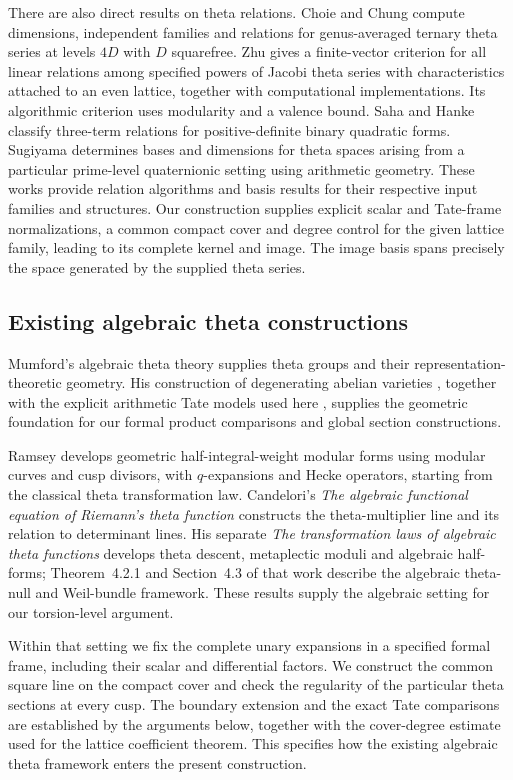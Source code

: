 \documentclass[11pt]{article}
\theoremstyle{remark}\newtheorem{remark}[theorem]{Remark}
\begin{document}
There are also direct results on theta relations. Choie and Chung
\cite{choie-chung} compute dimensions, independent families and relations
for genus-averaged ternary theta series at levels $4D$ with $D$ squarefree.
Zhu \cite[Theorem 7.10]{zhu} gives a finite-vector criterion for all linear
relations among specified powers of Jacobi theta series with characteristics
attached to an even lattice, together with computational implementations.
Its algorithmic criterion uses modularity and a valence bound. Saha and Hanke
\cite[Theorem 1.1]{saha-hanke} classify three-term relations for positive-definite
binary quadratic forms. Sugiyama \cite{sugiyama} determines bases and
dimensions for theta spaces arising from a particular prime-level
quaternionic setting using arithmetic geometry. These works provide
relation algorithms and basis results for their respective input families
and structures. Our construction supplies explicit scalar and Tate-frame
normalizations, a common compact cover and degree control for the given
lattice family, leading to its complete kernel and image. The image basis
spans precisely the space generated by the supplied theta series.

\subsection{Existing algebraic theta constructions}
Mumford's algebraic theta theory \cite{mumford-theta} supplies theta groups
and their representation-theoretic geometry. His construction of degenerating
abelian varieties \cite{mumford}, together with the explicit arithmetic
Tate models used here \cite{conrad}, supplies the geometric foundation for
our formal product comparisons and global section constructions.

Ramsey \cite{ramsey} develops geometric half-integral-weight modular forms
using modular curves and cusp divisors, with $q$-expansions and Hecke
operators, starting from the classical theta transformation law.
Candelori's \emph{The algebraic functional equation of Riemann's theta
function} \cite{candelori-key} constructs the theta-multiplier line and its
relation to determinant lines. His separate \emph{The transformation laws
of algebraic theta functions} \cite{candelori} develops theta descent,
metaplectic moduli and algebraic half-forms; Theorem~4.2.1 and Section~4.3
of that work describe the algebraic theta-null and Weil-bundle framework.
These results supply the algebraic setting for our torsion-level argument.

Within that setting we fix the complete unary expansions in a specified
formal frame, including their scalar and differential factors. We construct
the common square line on the compact cover and check the regularity of
the particular theta sections at every cusp. The boundary extension and
the exact Tate comparisons are established by the arguments below, together
with the cover-degree estimate used for the lattice coefficient theorem.
This specifies how the existing algebraic theta framework enters the
present construction.
\end{document}
